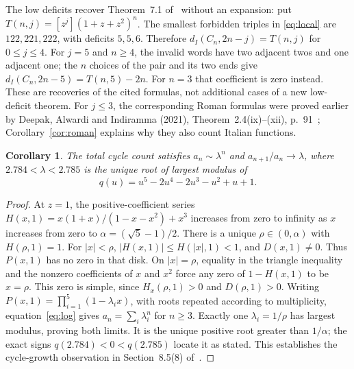\documentclass[11pt]{article}
\newtheorem{corollary}[theorem]{Corollary}
\newcommand{\di}{d_I}
\newcommand{\coef}[1]{[z^{#1}]}
\begin{document}
The low deficits recover Theorem~7.1 of~\cite{SZ} without an expansion:
put $T(n,j)=\coef{j}(1+z+z^2)^n$. The smallest forbidden triples in
\eqref{eq:local} are $122,221,222$, with deficits $5,5,6$.
Therefore $\di(C_n,2n-j)=T(n,j)$ for $0\leq j\leq4$.
For $j=5$ and $n\geq4$, the invalid words have two adjacent twos and
one adjacent one; the $n$ choices of the pair and its two ends give
$\di(C_n,2n-5)=T(n,5)-2n$. For $n=3$ that coefficient is zero instead.
These are recoveries of the cited formulas, not additional cases of a
new low-deficit theorem.
For $j\leq3$, the corresponding Roman formulas were proved earlier by
Deepak, Alwardi and Indiramma (2021), Theorem~2.4(ix)--(xii), p.~91~\cite{DAI};
Corollary~\ref{cor:roman} explains why they also count Italian functions.

\begin{corollary}\label{cor:growth}
The total cycle count satisfies $a_n\sim\lambda^n$ and
$a_{n+1}/a_n\to\lambda$, where $2.784<\lambda<2.785$ is the unique
root of largest modulus of
\[
 q(u)=u^5-2u^4-2u^3-u^2+u+1.
\]
\end{corollary}
\begin{proof}
At $z=1$, the positive-coefficient series
$H(x,1)=x(1+x)/(1-x-x^2)+x^3$ increases from zero to infinity as
$x$ increases from zero to $\alpha=(\sqrt5-1)/2$.
There is a unique $\rho\in(0,\alpha)$ with $H(\rho,1)=1$.
For $|x|<\rho$, $|H(x,1)|\leq H(|x|,1)<1$, and $D(x,1)\ne0$.
Thus $P(x,1)$ has no zero in that disk. On $|x|=\rho$, equality
in the triangle inequality and the nonzero coefficients of $x$ and
$x^2$ force any zero of $1-H(x,1)$ to be $x=\rho$.
This zero is simple, since $H_x(\rho,1)>0$ and $D(\rho,1)>0$.
Writing $P(x,1)=\prod_{i=1}^5(1-\lambda_i x)$, with roots repeated
according to multiplicity, equation~\eqref{eq:log} gives
$a_n=\sum_i\lambda_i^n$ for $n\geq3$.
Exactly one $\lambda_i=1/\rho$ has largest modulus, proving both limits.
It is the unique positive root greater than $1/\alpha$; the exact signs
$q(2.784)<0<q(2.785)$ locate it as stated. This establishes the
cycle-growth observation in Section~8.5(8) of~\cite{SZ}.
\end{proof}
\end{document}

